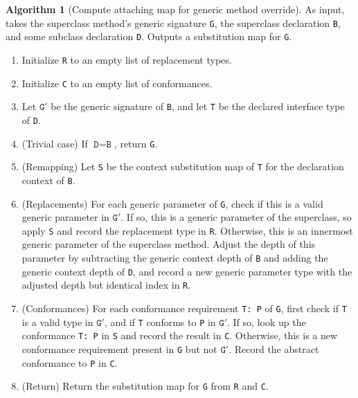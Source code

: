 \documentclass[a4paper,headsepline,bibliography=totoc,toc=flat,fleqn,twoside=semi]{scrbook}
\theoremstyle{definition}
\theoremstyle{definition}
\theoremstyle{definition}
\newtheorem{algorithm}{Algorithm}[chapter]
\begin{document}
\begin{algorithm}[Compute attaching map for generic method override]\label{superclass attaching map} As input, takes the superclass method's generic signature \texttt{G}, the superclass declaration \texttt{B}, and some subclass declaration \texttt{D}. Outputs a substitution map for \texttt{G}.
\begin{enumerate}
\item Initialize \texttt{R} to an empty list of replacement types.
\item Initialize \texttt{C} to an empty list of conformances.
\item Let $\texttt{G}'$ be the generic signature of \texttt{B}, and let \texttt{T} be the declared interface type of \texttt{D}.
\item (Trivial case) If $\texttt{D}=\texttt{B}$, return \texttt{G}.
\item (Remapping) Let \texttt{S} be the context substitution map of \texttt{T} for the declaration context of \texttt{B}.
\item (Replacements) For each generic parameter of \texttt{G}, check if this is a valid generic parameter in $\texttt{G}'$. If so, this is a generic parameter of the superclass, so apply \texttt{S} and record the replacement type in \texttt{R}. Otherwise, this is an innermost generic parameter of the superclass method. Adjust the depth of this parameter by subtracting the generic context depth of \texttt{B} and adding the generic context depth of \texttt{D}, and record a new generic parameter type with the adjusted depth but identical index in \texttt{R}.

\item (Conformances) For each conformance requirement \texttt{T:\ P} of \texttt{G}, first check if \texttt{T} is a valid type in $\texttt{G}'$, and if \texttt{T} conforms to \texttt{P} in $\texttt{G}'$. If so, look up the conformance \texttt{T:\ P} in \texttt{S} and record the result in \texttt{C}. Otherwise, this is a new conformance requirement present in \texttt{G} but not $\texttt{G}'$. Record the abstract conformance to \texttt{P} in \texttt{C}.

\item (Return) Return the substitution map for \texttt{G} from \texttt{R} and \texttt{C}.
\end{enumerate}
\end{algorithm}
\end{document}
